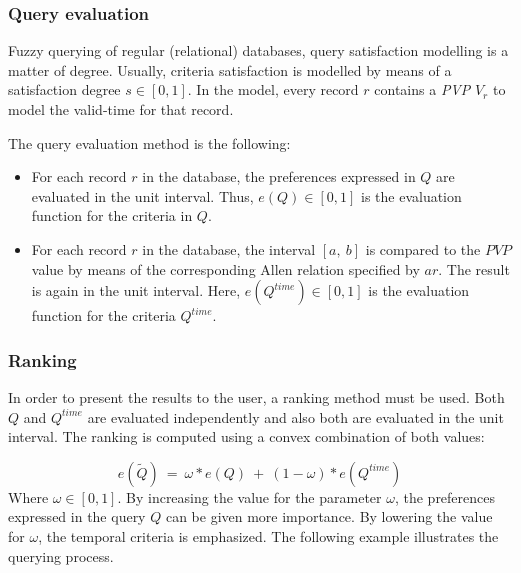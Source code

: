 \subsubsection{Query evaluation}
Fuzzy querying of regular (relational) databases, query satisfaction modelling is a matter of degree. Usually, criteria satisfaction is modelled by means of a satisfaction degree $s \in \left[ 0, 1\right]$. In the model, every record $r$ contains a \emph{PVP} $V_r$ to model the valid-time for that record.

The query evaluation method is the following:
\begin{itemize}
\item
For each record $r$ in the database, the preferences expressed in $Q$ are evaluated in the unit interval. Thus, $e(Q) \in \left[0, 1\right]$ is the evaluation function for the criteria in $Q$.
\item
For each record $r$ in the database, the interval $ \left[a, \ b \right]$ is compared to the $PVP$ value by means of the corresponding Allen relation specified by $ar$. The result is again in the unit interval. Here, $e(Q^{time}) \in \left[0, 1 \right]$ is the evaluation function for the criteria $Q^{time}$.
\end{itemize}


\subsubsection{Ranking}
In order to present the results to the user, a ranking method must be used. Both $Q$ and $Q^{time}$ are evaluated independently and also both are evaluated in the unit interval. The ranking is computed using a convex combination of both values:

\begin{equation}
e(\tilde{Q})\ =\ \omega*e(Q)\ +\ (1-\omega)*e(Q^{time})
\end{equation}
Where $\omega \in \left[0, 1 \right]$. By increasing the value for the parameter $\omega$, the preferences expressed in the query $Q$ can be given more importance. By lowering the value for $\omega$, the temporal criteria is emphasized.
The following example illustrates the querying process.



